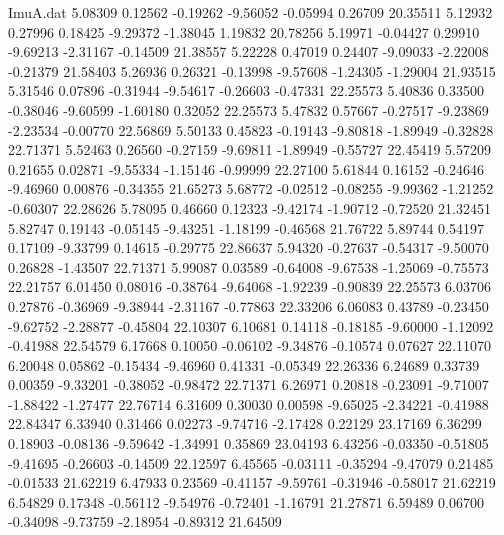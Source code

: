 \begin{filecontents}{ImuA.dat}
   5.08309    0.12562   -0.19262   -9.56052   -0.05994    0.26709   20.35511
   5.12932    0.27996    0.18425   -9.29372   -1.38045    1.19832   20.78256
   5.19971   -0.04427    0.29910   -9.69213   -2.31167   -0.14509   21.38557
   5.22228    0.47019    0.24407   -9.09033   -2.22008   -0.21379   21.58403
   5.26936    0.26321   -0.13998   -9.57608   -1.24305   -1.29004   21.93515
   5.31546    0.07896   -0.31944   -9.54617   -0.26603   -0.47331   22.25573
   5.40836    0.33500   -0.38046   -9.60599   -1.60180    0.32052   22.25573
   5.47832    0.57667   -0.27517   -9.23869   -2.23534   -0.00770   22.56869
   5.50133    0.45823   -0.19143   -9.80818   -1.89949   -0.32828   22.71371
   5.52463    0.26560   -0.27159   -9.69811   -1.89949   -0.55727   22.45419
   5.57209    0.21655    0.02871   -9.55334   -1.15146   -0.99999   22.27100
   5.61844    0.16152   -0.24646   -9.46960    0.00876   -0.34355   21.65273
   5.68772   -0.02512   -0.08255   -9.99362   -1.21252   -0.60307   22.28626
   5.78095    0.46660    0.12323   -9.42174   -1.90712   -0.72520   21.32451
   5.82747    0.19143   -0.05145   -9.43251   -1.18199   -0.46568   21.76722
   5.89744    0.54197    0.17109   -9.33799    0.14615   -0.29775   22.86637
   5.94320   -0.27637   -0.54317   -9.50070    0.26828   -1.43507   22.71371
   5.99087    0.03589   -0.64008   -9.67538   -1.25069   -0.75573   22.21757
   6.01450    0.08016   -0.38764   -9.64068   -1.92239   -0.90839   22.25573
   6.03706    0.27876   -0.36969   -9.38944   -2.31167   -0.77863   22.33206
   6.06083    0.43789   -0.23450   -9.62752   -2.28877   -0.45804   22.10307
   6.10681    0.14118   -0.18185   -9.60000   -1.12092   -0.41988   22.54579
   6.17668    0.10050   -0.06102   -9.34876   -0.10574    0.07627   22.11070
   6.20048    0.05862   -0.15434   -9.46960    0.41331   -0.05349   22.26336
   6.24689    0.33739    0.00359   -9.33201   -0.38052   -0.98472   22.71371
   6.26971    0.20818   -0.23091   -9.71007   -1.88422   -1.27477   22.76714
   6.31609    0.30030    0.00598   -9.65025   -2.34221   -0.41988   22.84347
   6.33940    0.31466    0.02273   -9.74716   -2.17428    0.22129   23.17169
   6.36299    0.18903   -0.08136   -9.59642   -1.34991    0.35869   23.04193
   6.43256   -0.03350   -0.51805   -9.41695   -0.26603   -0.14509   22.12597
   6.45565   -0.03111   -0.35294   -9.47079    0.21485   -0.01533   21.62219
   6.47933    0.23569   -0.41157   -9.59761   -0.31946   -0.58017   21.62219
   6.54829    0.17348   -0.56112   -9.54976   -0.72401   -1.16791   21.27871
   6.59489    0.06700   -0.34098   -9.73759   -2.18954   -0.89312   21.64509

\end{filecontents}
